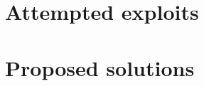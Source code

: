 \documentclass{tudelft-report}
\begin{document}
\chapter{Attempted exploits}\label{cha:3}






\chapter{Proposed solutions}\label{cha:4}





\appendix

%

\printbibliography
\end{document}
